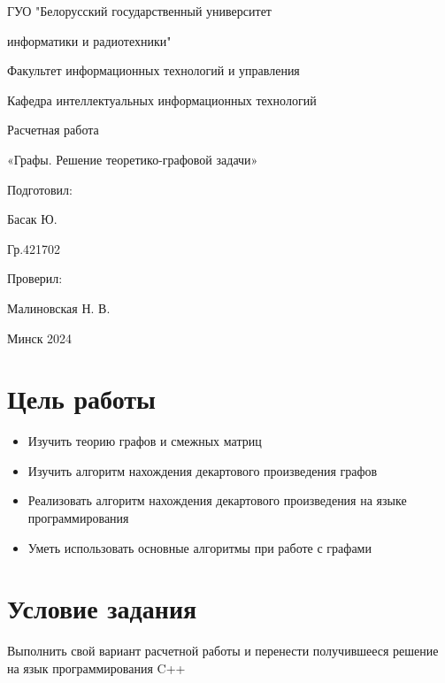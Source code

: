 \documentclass[a4paper,12pt]{article}
\begin{document}
\fontsize{12}{17}\selectfont
\begin{center} 
   \Large ГУО "Белорусский государственный университет \par
   информатики и радиотехники"\par
   Факультет информационных технологий и управления\par
   Кафедра интеллектуальных информационных технологий
   \end{center} \setlength{\parskip}{8cm} \par

\begin{center}

 \Large Расчетная работа
 \par \setlength{\parskip}{0.5cm}
\Large «Графы. Решение теоретико-графовой задачи»
\end{center}
\setlength{\parskip}{5cm}
\begin{flushright}
    Подготовил: \par
 \setlength{\parskip}{0.2cm}   
Басак Ю. \par
Гр.421702 \par
Проверил: 

Малиновская Н. В.
\setlength{\parskip}{2cm}
\begin{center}

Минск 2024
\end{center}

\end{flushright}
\section*{Цель работы}
   \setlength{\parskip}{1cm}
\begin{itemize}
    \item Изучить теорию графов и смежных матриц
    \item Изучить алгоритм нахождения декартового произведения графов
    \item Реализовать алгоритм нахождения декартового произведения на языке программирования
    \item Уметь использовать основные алгоритмы при работе с графами
\end{itemize}

\section*{Условие задания}
Выполнить свой вариант расчетной работы и перенести получившееся решение на язык программирования C++
\end{document}

